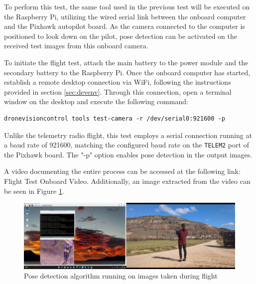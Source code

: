 To perform this test, the same tool used in the previous test will be executed on the Raspberry Pi, utilizing the wired serial link between the onboard computer and the Pixhawk autopilot board. As the camera connected to the computer is positioned to look down on the pilot, pose detection can be activated on the received test images from this onboard camera.

To initiate the flight test, attach the main battery to the power module and the secondary battery to the Raspberry Pi. Once the onboard computer has started, establish a remote desktop connection via WiFi, following the instructions provided in section \ref{sec:devenv}. Through this connection, open a terminal window on the desktop and execute the following command:
\begin{verbatim}
dronevisioncontrol tools test-camera -r /dev/serial0:921600 -p
\end{verbatim}


Unlike the telemetry radio flight, this test employs a serial connection running at a baud rate of 921600, matching the configured baud rate on the \texttt{TELEM2} port of the Pixhawk board. The "-p" option enables pose detection in the output images.

A video documenting the entire process can be accessed at the following link: Flight Test Onboard Video. Additionally, an image extracted from the video can be seen in Figure \ref{fig:flight-test-cam-onboard}.


\begin{figure}
  \centering
  \includegraphics[width=\textwidth, keepaspectratio]{img/video-field-test-onboard.png}
  \caption{Pose detection algorithm running on images taken during flight}
  \label{fig:flight-test-cam-onboard}
\end{figure}


